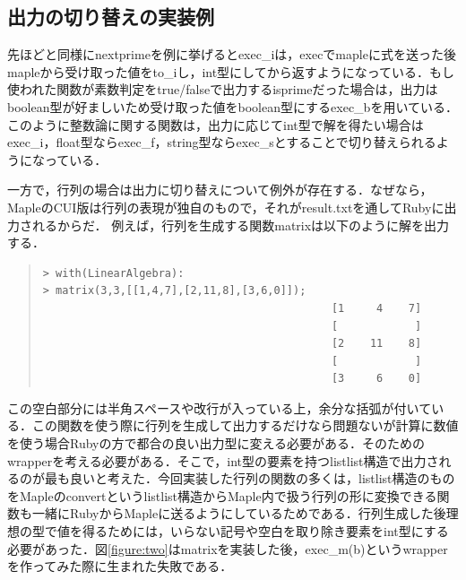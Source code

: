 \documentclass[10pt,a4j]{article}
\begin{document}
\subsection{出力の切り替えの実装例}
先ほどと同様にnextprimeを例に挙げるとexec\_iは，execでmapleに式を送った後mapleから受け取った値をto\_iし，int型にしてから返すようになっている．もし使われた関数が素数判定をtrue/falseで出力するisprimeだった場合は，出力はboolean型が好ましいため受け取った値をboolean型にするexec\_bを用いている．このように整数論に関する関数は，出力に応じてint型で解を得たい場合はexec\_i，float型ならexec\_f，string型ならexec\_sとすることで切り替えられるようになっている．

一方で，行列の場合は出力に切り替えについて例外が存在する．なぜなら，MapleのCUI版は行列の表現が独自のもので，それがresult.txtを通してRubyに出力されるからだ．
例えば，行列を生成する関数matrixは以下のように解を出力する．
\begin{quote}\begin{verbatim}
> with(LinearAlgebra):
> matrix(3,3,[[1,4,7],[2,11,8],[3,6,0]]);
                                             [1     4    7]
                                             [            ]
                                             [2    11    8]
                                             [            ]
                                             [3     6    0]
\end{verbatim}\end{quote}
この空白部分には半角スペースや改行が入っている上，余分な括弧が付いている．この関数を使う際に行列を生成して出力するだけなら問題ないが計算に数値を使う場合Rubyの方で都合の良い出力型に変える必要がある．そのためのwrapperを考える必要がある．そこで，int型の要素を持つlistlist構造で出力されるのが最も良いと考えた．今回実装した行列の関数の多くは，listlist構造のものをMapleのconvertというlistlist構造からMaple内で扱う行列の形に変換できる関数も一緒にRubyからMapleに送るようにしているためである．行列生成した後理想の型で値を得るためには，いらない記号や空白を取り除き要素をint型にする必要があった．図\ref{figure:two}はmatrixを実装した後，exec\_m(b)というwrapperを作ってみた際に生まれた失敗である．
\newpage
\end{document}

